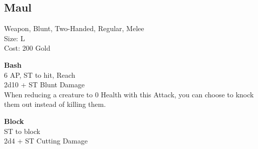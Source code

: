 \subsection{Maul}\label{weapon:maul}
Weapon, Blunt, Two-Handed, Regular, Melee\\
Size: L\\
Cost: 200 Gold

\textbf{Bash}\\
6 AP, ST to hit,  Reach\\
2d10 + ST Blunt Damage\\
When reducing a creature to 0 Health with this Attack, you can choose to knock them out instead of killing them.

\textbf{Block}\\
ST to block\\
2d4 + \texttimes ST Cutting Damage